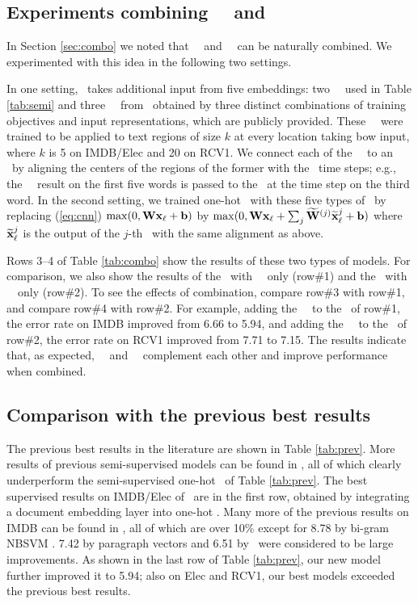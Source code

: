 \documentclass{article}
\begin{document}
\subsection{Experiments combining \cnn\ \tvEmbs\ and \lstm\ \tvEmbs}
\label{sec:comboexp}
In Section \ref{sec:combo} we noted that \lstm\ \tvEmbs\ and \cnn\ \tvEmbs\ 
can be naturally combined.  
We experimented with this idea in the following two settings.  

In one setting, 
\ohBiLstm\ takes additional input from five embeddings: two \lstm\ \tvEmbs\ used in Table \ref{tab:semi} 
and three \cnn\ \tvEmbs\ from \JZb\ 
obtained by three distinct combinations of 
training objectives and input representations, 
which are 
publicly provided.
These \cnn\ \tvEmbs\ were trained to be applied to text regions of size $k$ at every location taking bow input, 
where $k$ is 5 on IMDB/Elec and 20 on RCV1.  
We connect each of the \cnn\ \tvEmbs\ to an \lstm\ by aligning the centers 
of the regions of the former with the \lstm\ time steps; 
e.g., the \cnn\ \tvEmb\ result on 
the first five words is passed to the \lstm\ at the time step on the third word. 
In the second setting, 
we trained one-hot \cnn\ with these five types of \tvEmbs\ 
by replacing (\ref{eq:cnn}) 
$\max(0,{\mathbf W}{\mathbf x}_{\ell} + {\mathbf b})$ by 
$\max(0,{\mathbf W}{\mathbf x}_{\ell} + \sum_j {\widetilde{\mathbf W}^{(j)}}{\widetilde{{\mathbf x}}}^j_{\ell} + {\mathbf b})$ where 
${\widetilde{{\mathbf x}}}^j_{\ell}$ is the output of the $j$-th \tvEmb\ 
with the same alignment as above. 

Rows 3--4 of Table \ref{tab:combo} show the results of these two types of models.  
For comparison, we also show the results of 
the \lstm\ 
with \lstm\ \tvEmbs\ only 
(row\#1) and 
the \cnn\ 
with \cnn\ \tvEmbs\ only (row\#2). 
To see the effects of combination, compare row\#3 with row\#1, and compare row\#4 with row\#2.  
For example, 
adding the \cnn\ \tvEmbs\ to 
the \lstm\ 
of row\#1, the error rate on IMDB improved 
from 6.66 to 5.94, and 
adding the \lstm\ \tvEmbs\ to 
the \cnn\ 
of row\#2, the error rate on RCV1 improved 
from 7.71 to 7.15.  
The results indicate that, as expected, 
\lstm\ \tvEmbs\ and \cnn\ \tvEmbs\ complement each other and 
improve performance when combined.   

\subsection{Comparison with the previous best results} 
The previous best results in the literature are shown in Table \ref{tab:prev}.
More results of previous semi-supervised models can be found in \JZb, 
all of which clearly underperform the semi-supervised one-hot \cnn\ of Table \ref{tab:prev}.  
The best supervised results on IMDB/Elec of \JZa\ are in the first row, obtained by 
integrating a document embedding layer into one-hot \cnn.  
Many more of the previous results on IMDB can be found in \cite{LM14}, all of which are over 10\% 
except for 8.78 by bi-gram NBSVM \cite{WM12}.  
7.42 by paragraph vectors \cite{LM14} and 6.51 by \JZb\ were considered to be large improvements.  
As shown in the last row of Table \ref{tab:prev}, 
our new model further improved it to 5.94; 
also on Elec and RCV1, our best models exceeded the previous best results.  
\end{document}
